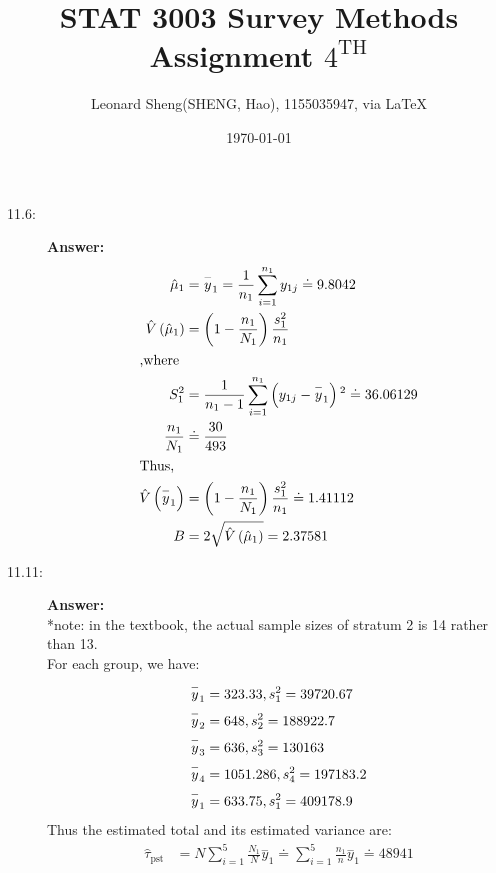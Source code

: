\documentclass{article}
\begin{document}
\title{STAT 3003 Survey Methods \\Assignment $4^{\text{TH}}$}
\author{{\normalsize Leonard Sheng(SHENG, Hao), 1155035947, via \LaTeX}}
\date{\today}

\maketitle

\def \Pr{{\rm Pr}}

\baselineskip 0.6cm
\begin{description}
    \item[11.6:]{\bf Answer:}
    \begin{align}
      \hat{\mu }_1&=\overset{-}{y}_1=\frac{1}{n_1}\sum _{i=1}^{n_1} y_{1j}\doteq 9.8042\\
      \hat{V}\left(\hat{\mu }_1\right)&=\left(1-\frac{n_1}{N_1}\right)\frac{s_1^2}{n_1}\\
      \intertext{,where}
      S_1^2&=\frac{1}{n_1-1}\sum _{i=1}^{n_1} \left(y_{1j}-\overset{-}{y}_1\right){}^2\doteq 36.06129\\
      \frac{n_1}{N_1}&\doteq \frac{30}{493}\\
      \intertext{Thus,}
      \hat{V}\left(\overset{-}{y}_1\right)&=\left(1-\frac{n_1}{N_1}\right)\frac{s_1^2}{n_1}\doteq 1.41112\\
      B&=2\sqrt{\hat{V}\left(\hat{\mu }_1\right)}=2.37581
    \end{align}
    \item[11.11:]{\bf Answer:}\\
    *note: in the textbook, the actual sample sizes of stratum 2 is 14 rather than 13.\\
    For each group, we have:
    \begin{align} \notag
        &\overset{-}{y}_1=323.33, s_1^2=39720.67\\ \notag
        &\overset{-}{y}_2=648, s_2^2=188922.7\\ \notag
        &\overset{-}{y}_3=636, s_3^2=130163\\ \notag
        &\overset{-}{y}_4=1051.286, s_4^2=197183.2\\ \notag
        &\overset{-}{y}_1=633.75, s_1^2=409178.9
    \end{align}
    Thus the estimated total and its estimated variance are:
    \begin{align}
      \hat{\tau }_{\text{pst}}&=N\sum _{i=1}^5 \frac{N_1}{N}\overset{-}{y}_1\doteq \sum _{i=1}^5 \frac{n_1}{n}\overset{-}{y}_1\doteq 48941\\

\end{align}
\end{description}
\end{document}
